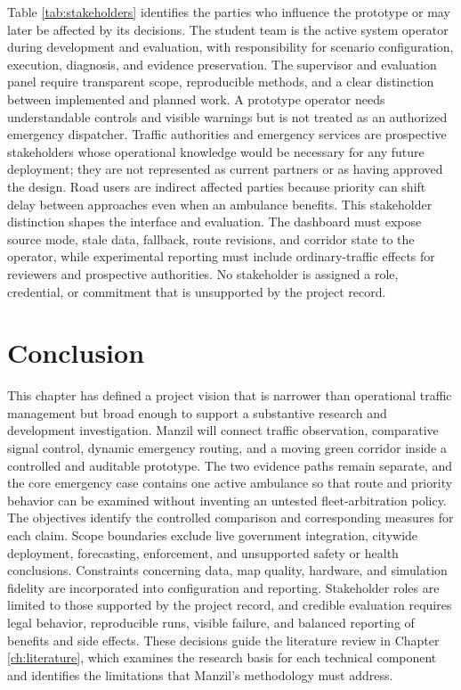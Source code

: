 Table \ref{tab:stakeholders} identifies the parties who influence the prototype or may later be affected by its decisions. The student team is the active system operator during development and evaluation, with responsibility for scenario configuration, execution, diagnosis, and evidence preservation. The supervisor and evaluation panel require transparent scope, reproducible methods, and a clear distinction between implemented and planned work. A prototype operator needs understandable controls and visible warnings but is not treated as an authorized emergency dispatcher. Traffic authorities and emergency services are prospective stakeholders whose operational knowledge would be necessary for any future deployment; they are not represented as current partners or as having approved the design. Road users are indirect affected parties because priority can shift delay between approaches even when an ambulance benefits. This stakeholder distinction shapes the interface and evaluation. The dashboard must expose source mode, stale data, fallback, route revisions, and corridor state to the operator, while experimental reporting must include ordinary-traffic effects for reviewers and prospective authorities. No stakeholder is assigned a role, credential, or commitment that is unsupported by the project record.

\section{Conclusion}

This chapter has defined a project vision that is narrower than operational traffic management but broad enough to support a substantive research and development investigation. Manzil will connect traffic observation, comparative signal control, dynamic emergency routing, and a moving green corridor inside a controlled and auditable prototype. The two evidence paths remain separate, and the core emergency case contains one active ambulance so that route and priority behavior can be examined without inventing an untested fleet-arbitration policy. The objectives identify the controlled comparison and corresponding measures for each claim. Scope boundaries exclude live government integration, citywide deployment, forecasting, enforcement, and unsupported safety or health conclusions. Constraints concerning data, map quality, hardware, and simulation fidelity are incorporated into configuration and reporting. Stakeholder roles are limited to those supported by the project record, and credible evaluation requires legal behavior, reproducible runs, visible failure, and balanced reporting of benefits and side effects. These decisions guide the literature review in Chapter \ref{ch:literature}, which examines the research basis for each technical component and identifies the limitations that Manzil's methodology must address.

